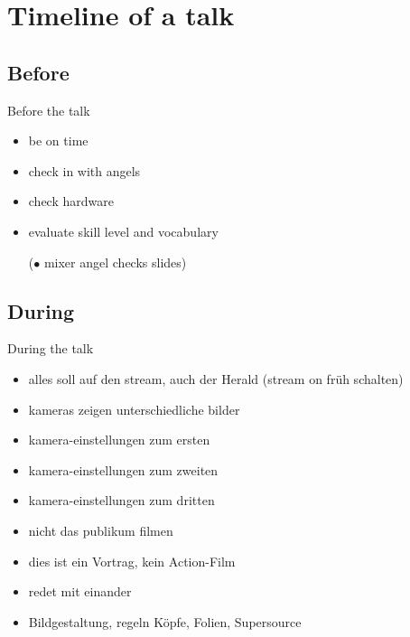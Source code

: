 \documentclass[hyperref={pdfpagelabels=false},aspectratio=169]{beamer}
\begin{document}
\section{Timeline of a talk}  %
\subsection{Before}
\begin{frame}{Before the talk}
\begin{itemize} %
\item be on time %
\item check in with angels %
\item check hardware %
\item evaluate skill level and vocabulary %
\item [($\bullet$] mixer angel checks slides) %
\end{itemize} 
\end{frame}


\subsection{During} %
\begin{frame}{During the talk}
\begin{itemize}
\item alles soll auf den stream, auch der Herald (stream on früh schalten)
\item  kameras zeigen unterschiedliche bilder 
\item  kamera-einstellungen zum ersten
\item  kamera-einstellungen zum zweiten
\item  kamera-einstellungen zum dritten
\item  nicht das publikum filmen
\item  dies ist ein Vortrag, kein Action-Film 
\item  redet mit einander 
\item  Bildgestaltung, regeln  Köpfe, Folien, Supersource
\end{itemize} 
\end{frame}
\end{document}
